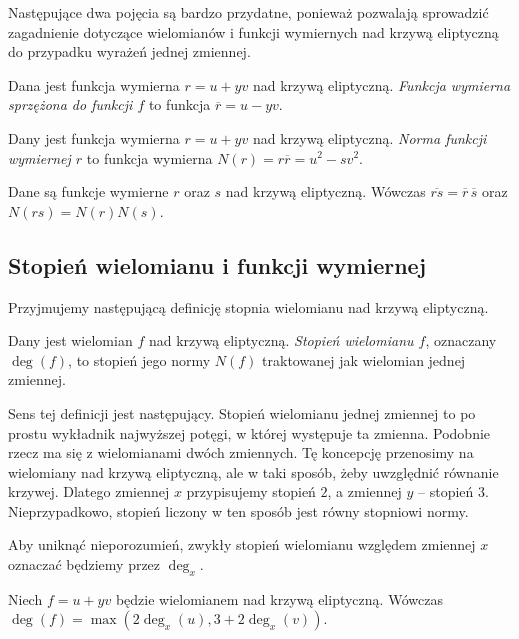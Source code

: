 Następujące dwa pojęcia są bardzo przydatne,
ponieważ pozwalają sprowadzić
zagadnienie dotyczące wielomianów i funkcji wymiernych nad krzywą eliptyczną
do przypadku wyrażeń jednej zmiennej.

\begin{definition}
Dana jest funkcja wymierna $r = u + yv$ nad krzywą eliptyczną.
\emph{Funkcja wymierna sprzężona do funkcji $f$}
to funkcja $\overline{r} = u - yv$.
\end{definition}

\begin{definition}
Dany jest funkcja wymierna $r = u + yv$ nad krzywą eliptyczną.
\emph{Norma funkcji wymiernej $r$}
to funkcja wymierna $N(r) = r\overline{r} = u^2 - sv^2$.
\end{definition}

\begin{fact}
Dane są funkcje wymierne $r$ oraz $s$ nad krzywą eliptyczną.
Wówczas $\overline{rs} = \overline{r}\,\overline{s}$
oraz $N(rs) = N(r)N(s)$.
\end{fact}

\subsection*{Stopień wielomianu i funkcji wymiernej}

Przyjmujemy następującą definicję stopnia wielomianu nad krzywą eliptyczną.

\begin{definition}
Dany jest wielomian $f$ nad krzywą eliptyczną.
\emph{Stopień wielomianu $f$},
oznaczany $\deg(f)$,
to stopień jego normy $N(f)$ traktowanej jak wielomian jednej zmiennej.
\end{definition}

Sens tej definicji jest następujący. Stopień wielomianu jednej zmiennej
to po prostu wykładnik najwyższej potęgi, w której występuje ta zmienna.
Podobnie rzecz ma się z wielomianami dwóch zmiennych.
Tę koncepcję przenosimy na wielomiany nad krzywą eliptyczną,
ale w taki sposób, żeby uwzględnić równanie krzywej.
Dlatego zmiennej $x$ przypisujemy stopień $2$,
a zmiennej $y$ -- stopień $3$.
Nieprzypadkowo, stopień liczony w ten sposób
jest równy stopniowi normy.

\begin{remark}
Aby uniknąć nieporozumień,
zwykły stopień wielomianu względem zmiennej $x$
oznaczać będziemy przez $\deg_x$.
\end{remark}

\begin{fact}
Niech $f = u + yv$ będzie wielomianem nad krzywą eliptyczną.
Wówczas $\deg(f) = \max(2\deg_x(u), 3 + 2\deg_x(v))$.
\end{fact}

